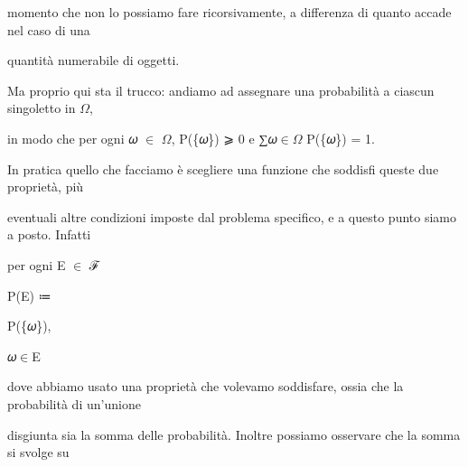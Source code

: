 \documentclass[a4paper,portrait,12pt]{article}
\begin{document}
\begin{flushleft}
momento che non lo possiamo fare ricorsivamente, a differenza di quanto accade nel caso di una
\end{flushleft}


\begin{flushleft}
quantit\`{a} numerabile di oggetti.
\end{flushleft}


\begin{flushleft}
Ma proprio qui sta il trucco: andiamo ad assegnare una probabilit\`{a} a ciascun singoletto in $\Omega$,
\end{flushleft}


\begin{flushleft}
in modo che per ogni 𝜔 $\in$ $\Omega$, P(\{𝜔\}) ⩾ 0 e ∑𝜔$\in$$\Omega$ P(\{𝜔\}) = 1.
\end{flushleft}


\begin{flushleft}
In pratica quello che facciamo \`{e} scegliere una funzione che soddisfi queste due propriet\`{a}, più
\end{flushleft}


\begin{flushleft}
eventuali altre condizioni imposte dal problema specifico, e a questo punto siamo a posto. Infatti
\end{flushleft}


\begin{flushleft}
per ogni E $\in$ ℱ
\end{flushleft}


\begin{flushleft}
P(E) ≔
\end{flushleft}





\begin{flushleft}
P(\{𝜔\}),
\end{flushleft}


\begin{flushleft}
𝜔$\in$E
\end{flushleft}





\begin{flushleft}
dove abbiamo usato una propriet\`{a} che volevamo soddisfare, ossia che la probabilit\`{a} di un'unione
\end{flushleft}


\begin{flushleft}
disgiunta sia la somma delle probabilit\`{a}. Inoltre possiamo osservare che la somma si svolge su
\end{flushleft}
\end{document}
